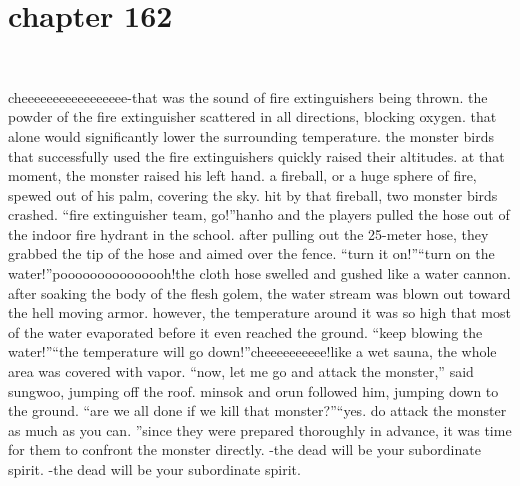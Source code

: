 \section{chapter 162}

                             




cheeeeeeeeeeeeeeeee-that was the sound of fire extinguishers being thrown.
 the powder of the fire extinguisher scattered in all directions, blocking oxygen.
 that alone would significantly lower the surrounding temperature.
the monster birds that successfully used the fire extinguishers quickly raised their altitudes.
at that moment, the monster raised his left hand.
a fireball, or a huge sphere of fire, spewed out of his palm, covering the sky.
hit by that fireball, two monster birds crashed.
“fire extinguisher team, go!”hanho and the players pulled the hose out of the indoor fire hydrant in the school.
after pulling out the 25-meter hose, they grabbed the tip of the hose and aimed over the fence.
“turn it on!”“turn on the water!”pooooooooooooooh!the cloth hose swelled and gushed like a water cannon.
 after soaking the body of the flesh golem, the water stream was blown out toward the hell moving armor.
however, the temperature around it was so high that most of the water evaporated before it even reached the ground.
“keep blowing the water!”“the temperature will go down!”cheeeeeeeeee!like a wet sauna, the whole area was covered with vapor.
“now, let me go and attack the monster,” said sungwoo, jumping off the roof.
minsok and orun followed him, jumping down to the ground.
“are we all done if we kill that monster?”“yes.
 do attack the monster as much as you can.
”since they were prepared thoroughly in advance, it was time for them to confront the monster directly.
-the dead will be your subordinate spirit.
-the dead will be your subordinate spirit.

